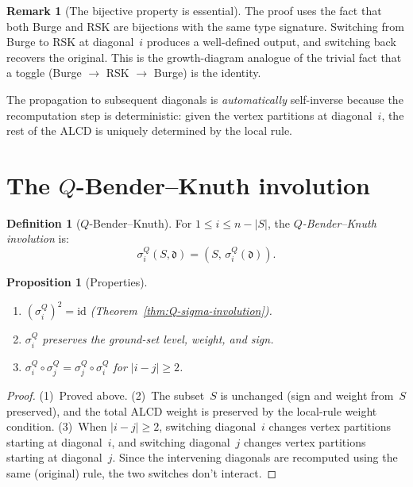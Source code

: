 \documentclass[11pt]{article}
\theoremstyle{plain}
\newtheorem{proposition}[theorem]{Proposition}
\theoremstyle{definition}
\newtheorem{definition}[theorem]{Definition}
\newtheorem{remark}[theorem]{Remark}
\begin{document}
\begin{remark}[The bijective property is essential]
\label{rem:bijective}
The proof uses the fact that both Burge and RSK are bijections
with the same type signature.  Switching from Burge to RSK at
diagonal~$i$ produces a well-defined output, and switching
back recovers the original.  This is the growth-diagram
analogue of the trivial fact that a toggle (Burge $\to$ RSK
$\to$ Burge) is the identity.

The propagation to subsequent diagonals is
\emph{automatically} self-inverse because the recomputation
step is deterministic: given the vertex partitions at
diagonal~$i$, the rest of the ALCD is uniquely determined
by the local rule.
\end{remark}


\section{The $Q$-Bender--Knuth involution}
\label{sec:Q-BK}

\begin{definition}[$Q$-Bender--Knuth]
\label{def:Q-BK}
For $1 \leq i \leq n - |S|$, the \emph{$Q$-Bender--Knuth
involution} is:
\[
  \sigma_i^Q(S, \mathfrak{d})
  = (S,\, \sigma_i^Q(\mathfrak{d})).
\]
\end{definition}

\begin{proposition}[Properties]
\label{prop:Q-BK-properties}
\mbox{}
\begin{enumerate}
  \item $(\sigma_i^Q)^2 = \mathrm{id}$
    \textup{(Theorem~\ref{thm:Q-sigma-involution})}.
  \item $\sigma_i^Q$ preserves the ground-set level, weight,
    and sign.
  \item $\sigma_i^Q \circ \sigma_j^Q
    = \sigma_j^Q \circ \sigma_i^Q$ for $|i - j| \geq 2$.
\end{enumerate}
\end{proposition}

\begin{proof}
(1)~Proved above.
(2)~The subset~$S$ is unchanged (sign and weight from~$S$
preserved), and the total ALCD weight is preserved by the
local-rule weight condition.
(3)~When $|i - j| \geq 2$, switching diagonal~$i$ changes
vertex partitions starting at diagonal~$i$, and switching
diagonal~$j$ changes vertex partitions starting at
diagonal~$j$.  Since the intervening diagonals are recomputed
using the same (original) rule, the two switches don't
interact.
\end{proof}
\end{document}
